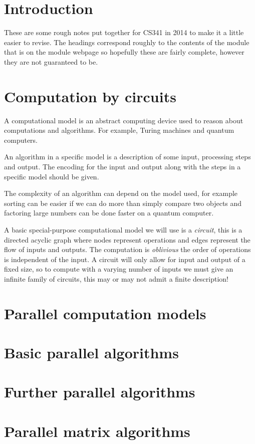 \documentclass[11pt,a4paper]{article}
\begin{document}
\maketitle

\section{Introduction}
These are some rough notes put together for CS341 in 2014 to make it a little easier to revise.
The headings correspond roughly to the contents of the module that is on the module webpage so hopefully these are fairly complete, however they are not guaranteed to be.

\section{Computation by circuits}
A computational model is an abstract computing device used to reason about computations and algorithms.
For example, Turing machines and quantum computers.

An algorithm in a specific model is a description of some input, processing steps and output.
The encoding for the input and output along with the steps in a specific model should be given.

The complexity of an algorithm can depend on the model used, for example sorting can be easier if we can do more than simply compare two objects and factoring large numbers can be done faster on a quantum computer.

A basic special-purpose computational model we will use is a \emph{circuit}, this is a directed acyclic graph where nodes represent operations and edges represent the flow of inputs and outputs.
The computation is \emph{oblivious} the order of operations is independent of the input.
A circuit will only allow for input and output of a fixed size, so to compute with a varying number of inputs we must give an infinite family of circuits, this may or may not admit a finite description!

\section{Parallel computation models}

\section{Basic parallel algorithms}

\section{Further parallel algorithms}

\section{Parallel matrix algorithms}
\end{document}
